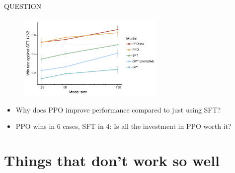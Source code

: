 \begin{vbframe}{QUESTION}

\vfill

\begin{figure}
\centering
\includegraphics[width = 7cm]{figure/mainresult.png}
\end{figure}

\begin{itemize}
        \item Why does PPO improve performance compared to
        just using SFT?
        \item PPO wins in 6 cases, SFT in 4: Is all the
        investment in PPO worth it?
\end{itemize}

\vfill

\end{vbframe}





\section{Things that don't work so well}











